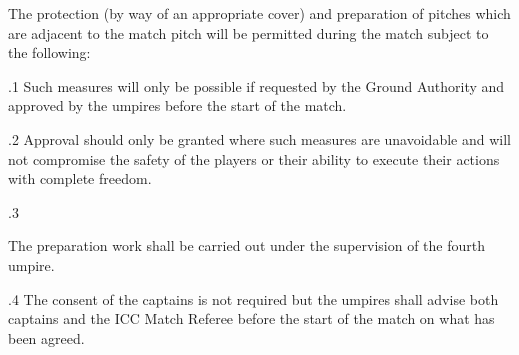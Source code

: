 \documentclass[12pt]{article}
\begin{document}
\vspace{\baselineskip}
\begin{adjustwidth}{0.0in}{0.1in}
{\fontsize{9pt}{10.8pt}\selectfont The protection (by way of an appropriate cover) and preparation of pitches which are adjacent to the match pitch will be permitted during the match subject to the following:\par}\par

\end{adjustwidth}


\vspace{\baselineskip}
\begin{adjustwidth}{0.5in}{0.29in}
{\fontsize{9pt}{10.8pt}.1 \tabto{0.49in} Such measures will only be possible if requested by the Ground Authority and approved by the umpires before the start of the match.\par}\par

\end{adjustwidth}


\vspace{\baselineskip}
\begin{adjustwidth}{0.5in}{0.08in}
{\fontsize{9pt}{10.8pt}.2 \tabto{0.49in} Approval should only be granted where such measures are unavoidable and will not compromise the safety of the players or their ability to execute their actions with complete freedom.\par}\par

\end{adjustwidth}


\vspace{\baselineskip}
{\fontsize{9pt}{10.8pt}.3 \tabto{0.49in} {\fontsize{8pt}{9.6pt}\selectfont The preparation work shall be carried out under the supervision of the fourth umpire.\par}\par}\par


\vspace{\baselineskip}
\begin{adjustwidth}{0.5in}{0.21in}
{\fontsize{9pt}{10.8pt}.4 \tabto{0.49in} The consent of the captains is not required but the umpires shall advise both captains and the ICC Match Referee before the start of the match on what has been agreed.\par}\par

\end{adjustwidth}
\end{document}
